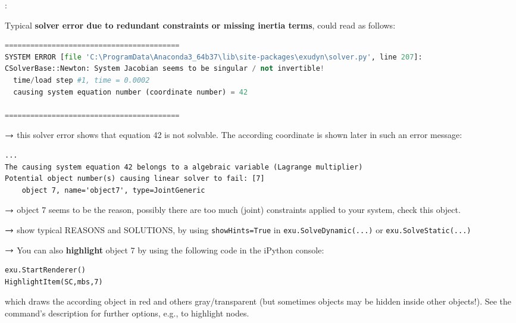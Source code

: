 :
\bi
  \item Typical {\bf solver error due to redundant constraints or missing inertia terms}, could read as follows:
\plainlststyle
	{\ttfamily \footnotesize
	\begin{lstlisting}[language=Python, breaklines=true]
=========================================
SYSTEM ERROR [file 'C:\ProgramData\Anaconda3_64b37\lib\site-packages\exudyn\solver.py', line 207]: 
CSolverBase::Newton: System Jacobian seems to be singular / not invertible!
  time/load step #1, time = 0.0002
  causing system equation number (coordinate number) = 42

=========================================
	\end{lstlisting}
	}
	\item[] $\rightarrow$ this solver error shows that equation 42 is not solvable. The according coordinate is 
	shown later in such an error message:
\plainlststyle
	{\ttfamily \footnotesize
	\begin{lstlisting}[breaklines=true]
...
The causing system equation 42 belongs to a algebraic variable (Lagrange multiplier)
Potential object number(s) causing linear solver to fail: [7]
    object 7, name='object7', type=JointGeneric
	\end{lstlisting}
	}
	\item[] $\rightarrow$ object 7 seems to be the reason, possibly there are too much (joint) constraints applied
	to your system, check this object.
	\item[] $\rightarrow$ show typical REASONS and SOLUTIONS, by using \texttt{showHints=True} in \texttt{exu.SolveDynamic(...)} or 
	\texttt{exu.SolveStatic(...)}
	\item[] $\rightarrow$ You can also {\bf highlight} object 7 by using the following code in the iPython console:
\pythonstyle
	{\ttfamily \footnotesize
	\begin{lstlisting}[breaklines=true]
exu.StartRenderer()
HighlightItem(SC,mbs,7)
	\end{lstlisting}
	}
\plainlststyle
	\item[] which draws the according object in red and others gray/transparent (but sometimes objects may be hidden inside other objects!). See the 
	command's description for further options, e.g., to highlight nodes.
